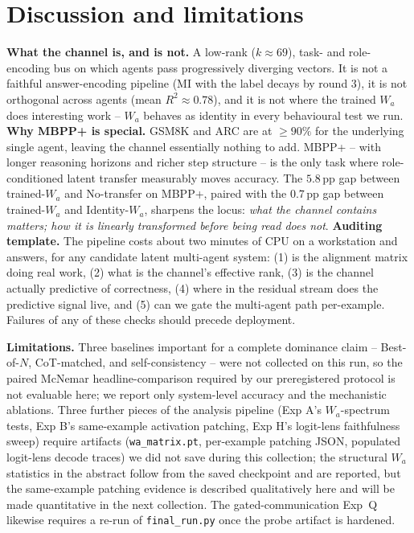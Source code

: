 \documentclass{article}
\begin{document}
\section{Discussion and limitations}
\label{sec:discussion}

\textbf{What the channel is, and is not.} A low-rank ($k \approx 69$), task- and role-encoding bus on which agents pass progressively diverging vectors. It is not a faithful answer-encoding pipeline (MI with the label decays by round $3$), it is not orthogonal across agents (mean $R^2 \approx 0.78$), and it is not where the trained $W_a$ does interesting work -- $W_a$ behaves as identity in every behavioural test we run. \textbf{Why MBPP+ is special.} GSM8K and ARC are at $\geq 90\%$ for the underlying single agent, leaving the channel essentially nothing to add. MBPP+ -- with longer reasoning horizons and richer step structure -- is the only task where role-conditioned latent transfer measurably moves accuracy. The $5.8$\,pp gap between trained-$W_a$ and No-transfer on MBPP+, paired with the $0.7$\,pp gap between trained-$W_a$ and Identity-$W_a$, sharpens the locus: \emph{what the channel contains matters; how it is linearly transformed before being read does not}. \textbf{Auditing template.} The pipeline costs about two minutes of CPU on a workstation and answers, for any candidate latent multi-agent system: (1) is the alignment matrix doing real work, (2) what is the channel's effective rank, (3) is the channel actually predictive of correctness, (4) where in the residual stream does the predictive signal live, and (5) can we gate the multi-agent path per-example. Failures of any of these checks should precede deployment.

\textbf{Limitations.} Three baselines important for a complete dominance claim -- Best-of-$N$, CoT-matched, and self-consistency -- were not collected on this run, so the paired McNemar headline-comparison required by our preregistered protocol is not evaluable here; we report only system-level accuracy and the mechanistic ablations. Three further pieces of the analysis pipeline (Exp A's $W_a$-spectrum tests, Exp B's same-example activation patching, Exp H's logit-lens faithfulness sweep) require artifacts (\texttt{wa\_matrix.pt}, per-example patching JSON, populated logit-lens decode traces) we did not save during this collection; the structural $W_a$ statistics in the abstract follow from the saved checkpoint and are reported, but the same-example patching evidence is described qualitatively here and will be made quantitative in the next collection. The gated-communication Exp~Q likewise requires a re-run of \texttt{final\_run.py} once the probe artifact is hardened.
\end{document}
